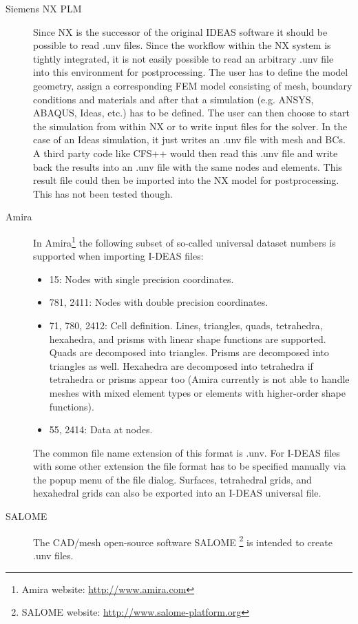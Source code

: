 \begin{description}
\item[Siemens NX PLM] Since NX is the successor of the original IDEAS software
it should  be possible to read .unv  files.  Since the workflow  within the NX
system is tightly  integrated, it is not easily possible  to read an arbitrary
.unv file into this environment for postprocessing. The user has to define the
model geometry, assign a corresponding  FEM model consisting of mesh, boundary
conditions  and materials  and after  that a  simulation (e.g.  ANSYS, ABAQUS,
Ideas,  etc.)  has  to be  defined.  The  user can  then choose  to  start the
simulation from within NX or to write  input files for the solver. In the case
of an  Ideas simulation, it  just writes  an .unv file  with mesh and  BCs.  A
third party code like CFS++ would then  read this .unv file and write back the
results into an  .unv file with the same nodes and  elements. This result file
could then  be imported into  the NX model  for postprocessing.  This  has not
been tested though.


\item[Amira] In  Amira\footnote{Amira website: \url{http://www.amira.com}} the
following  subset of  so-called universal  dataset numbers  is  supported when
importing I-DEAS files:

\begin{itemize}
\item 15: Nodes with single precision coordinates.
\item 781, 2411: Nodes with double precision coordinates.
\item  71, 780, 2412:  Cell definition.  Lines, triangles,  quads, tetrahedra,
hexahedra, and  prisms with  linear shape functions  are supported.  Quads are
decomposed   into  triangles.   Prisms  are   decomposed  into   triangles  as
well. Hexahedra are decomposed into  tetrahedra if tetrahedra or prisms appear
too (Amira currently is not able  to handle meshes with mixed element types or
elements with higher-order shape functions).
\item 55, 2414: Data at nodes.
\end{itemize}  The common  file name  extension of  this format  is  .unv. For
I-DEAS files  with some other  extension the file  format has to  be specified
manually via the  popup menu of the file  dialog. Surfaces, tetrahedral grids,
and hexahedral grids can also be exported into an I-DEAS universal file.

\item[SALOME]  The  CAD/mesh   open-source  software  SALOME  \footnote{SALOME
website:  \url{http://www.salome-platform.org}}  is  intended to  create  .unv
files.


\end{description}
